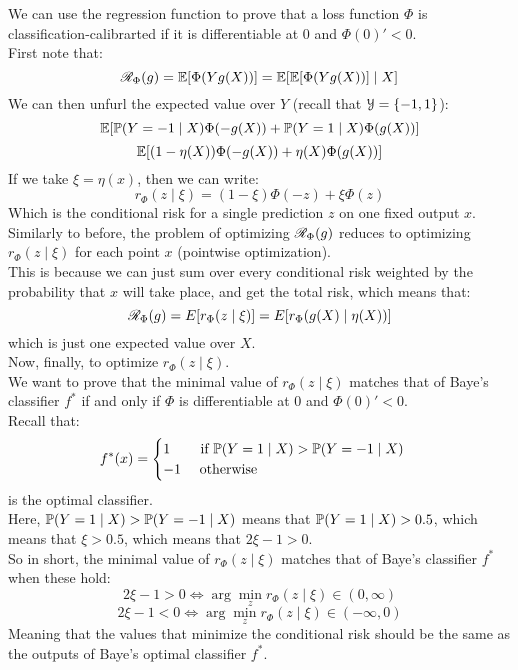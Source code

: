 \documentclass[12pt]{article}
\begin{document}
We can use the regression function
to prove that a loss function $\Phi$
is classification-calibrarted
if it is differentiable at $0$
and $\Phi(0)' < 0$. \\

First note that:
\[ \mathscr{R}_\Phi(g)
= \mathbb{E}[\Phi(Yg(X))]
= \mathbb{E}[\mathbb{E}[\Phi(Yg(X))] \mid X ] \]
We can then unfurl the expected value
over $Y$
(recall that $\mathcal{Y} = \{-1, 1\}$):
\[ \mathbb{E}[\mathbb{P}(Y = -1 \mid X)\Phi(-g(X))
+ \mathbb{P}(Y = 1 \mid X)\Phi(g(X))] \]
\[ \mathbb{E}[(1-\eta(X))\Phi(-g(X))
+ \eta(X)\Phi(g(X))] \]
If we take $\xi = \eta(x)$,
then we can write:
\[ r_\Phi(z \mid \xi)
= (1-\xi)\Phi(-z) + \xi\Phi(z) \]
Which is the conditional risk for
a single prediction $z$
on one fixed output $x$. \\

Similarly to before, the problem of optimizing
$\mathscr{R}_\Phi(g)$ reduces to optimizing
$r_\Phi(z \mid \xi)$ for each point $x$
(pointwise optimization). \\
This is because we can just sum over
every conditional risk weighted by the probability
that $x$ will take place,
and get the total risk,
which means that:
\[ \mathscr{R}_\Phi(g) = E[r_\Phi(z \mid \xi)]
= E[r_\Phi(g(X) \mid \eta(X))] \]
which is just one expected value over $X$. \\

Now, finally, to optimize $r_\Phi(z \mid \xi)$. \\
We want to prove that 
the minimal value of $r_\Phi(z \mid \xi)$
matches that of Baye's classifier $f^*$
if and only if $\Phi$
is differentiable at $0$
and $\Phi(0)' < 0$. \\

Recall that:
\[ f^*(x) = \begin{cases} 1 \quad \;\;\; \text{ if }
\mathbb{P}(Y = 1 \mid X) >
\mathbb{P}(Y = -1 \mid X) \\ -1 \quad \text{ otherwise } \end{cases} \]
is the optimal classifier. \\

Here, $\mathbb{P}(Y = 1 \mid X) > \mathbb{P}(Y = -1 \mid X)$
means that $\mathbb{P}(Y = 1 \mid X) > 0.5$,
which means that $\xi > 0.5$,
which means that $2\xi - 1 > 0$. \\
So in short, 
the minimal value of $r_\Phi(z \mid \xi)$
matches that of Baye's classifier $f^*$ when
these hold:
\[ 2\xi - 1 > 0 \iff 
\arg \min_z r_\Phi(z \mid \xi) \in (0, \infty) \]
\[ 2\xi - 1 < 0 \iff 
\arg \min_z r_\Phi(z \mid \xi) \in (-\infty, 0) \]
Meaning that the values that minimize the
conditional risk
should be the same as the outputs of Baye's
optimal classifier $f^*$. \\
\end{document}
